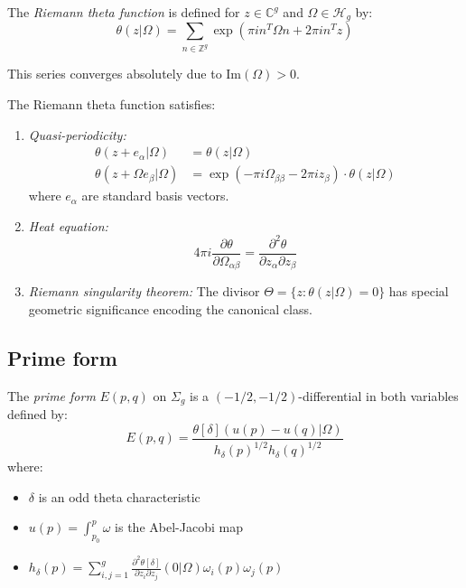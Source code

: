\begin{definition}
\label{def:riemann-theta}
The \emph{Riemann theta function} is defined for $z \in \mathbb{C}^g$ and $\Omega \in \mathcal{H}_g$ by:
\begin{equation}
\theta(z|\Omega) = \sum_{n \in \mathbb{Z}^g} \exp\left(\pi i n^T \Omega n + 2\pi i n^T z\right)
\end{equation}

This series converges absolutely due to Im$(\Omega) > 0$.
\end{definition}

\begin{theorem}
\label{thm:theta-properties}
The Riemann theta function satisfies:
\begin{enumerate}
\item \emph{Quasi-periodicity:}
\begin{align}
\theta(z + e_\alpha|\Omega) &= \theta(z|\Omega)\\
\theta(z + \Omega e_\beta|\Omega) &= \exp(-\pi i \Omega_{\beta\beta} - 2\pi i z_\beta) \cdot \theta(z|\Omega)
\end{align}
where $e_\alpha$ are standard basis vectors.

\item \emph{Heat equation:}
\begin{equation}
4\pi i \frac{\partial \theta}{\partial \Omega_{\alpha\beta}} = \frac{\partial^2 \theta}{\partial z_\alpha \partial z_\beta}
\end{equation}

\item \emph{Riemann singularity theorem:} The divisor $\Theta = \{z : \theta(z|\Omega) = 0\}$ has special geometric significance encoding the canonical class.
\end{enumerate}
\end{theorem}

\subsection{Prime form}

\begin{definition}
\label{def:prime-form}
The \emph{prime form} $E(p, q)$ on $\Sigma_g$ is a $(-1/2, -1/2)$-differential in both variables defined by:
\begin{equation}
E(p, q) = \frac{\theta[\delta](u(p) - u(q)|\Omega)}{h_\delta(p)^{1/2} h_\delta(q)^{1/2}}
\end{equation}
where:
\begin{itemize}
\item $\delta$ is an odd theta characteristic
\item $u(p) = \int_{p_0}^p \omega$ is the Abel-Jacobi map
\item $h_\delta(p) = \sum_{i,j=1}^g \frac{\partial^2 \theta[\delta]}{\partial z_i \partial z_j}(0|\Omega) \omega_i(p) \omega_j(p)$
\end{itemize}
\end{definition}

